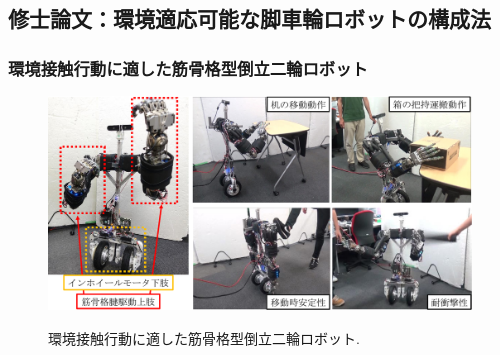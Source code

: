 \documentclass[twocolumn]{d-abst}
\begin{document}
\subsection{修士論文：環境適応可能な脚車輪ロボットの構成法}

\subsubsection{環境接触行動に適した筋骨格型倒立二輪ロボット}

\begin{figure}[tbh]
 \begin{center}
  \begin{minipage}{1.0\columnwidth}
   \includegraphics[width=\columnwidth]{2_twimp.pdf}
   \caption{環境接触行動に適した筋骨格型倒立二輪ロボット.}
  \end{minipage}
  \label{figure:nowprinting}
 \end{center}
\end{figure}
\end{document}
